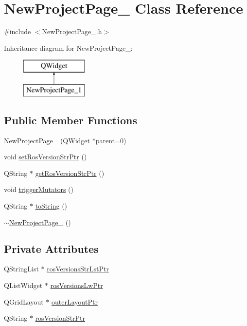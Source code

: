 \hypertarget{class_new_project_page__1}{\section{New\-Project\-Page\-\_ Class Reference}
\label{class_new_project_page__1}
}


{\ttfamily \#include $<$New\-Project\-Page\-\_.\-h$>$}

Inheritance diagram for New\-Project\-Page\-\_\-:\begin{figure}[H]
\begin{center}
\leavevmode
\includegraphics[height=2.000000cm]{class_new_project_page__1}
\end{center}
\end{figure}
\subsection*{Public Member Functions}
\begin{DoxyCompactItemize}
\item 
\hyperlink{class_new_project_page__1_a07325313c0bd209fbb9062e779276cff}{New\-Project\-Page\-\_} (Q\-Widget $\ast$parent=0)
\item 
void \hyperlink{class_new_project_page__1_a49402d5661fd96e07e285dc7d2605d9a}{set\-Ros\-Version\-Str\-Ptr} ()
\item 
Q\-String $\ast$ \hyperlink{class_new_project_page__1_a1c3596224d1afd5eba915c537648c3e7}{get\-Ros\-Version\-Str\-Ptr} ()
\item 
void \hyperlink{class_new_project_page__1_ac71e31a9a906f731b70711346bfa262d}{trigger\-Mutators} ()
\item 
Q\-String $\ast$ \hyperlink{class_new_project_page__1_aa83d0dab668fb77a30a2275b59d654e0}{to\-String} ()
\item 
\hyperlink{class_new_project_page__1_a716011001a4f599c2b7f2d53c0429dfb}{$\sim$\-New\-Project\-Page\-\_} ()
\end{DoxyCompactItemize}
\subsection*{Private Attributes}
\begin{DoxyCompactItemize}
\item 
Q\-String\-List $\ast$ \hyperlink{class_new_project_page__1_a63e7e74af698edd3d4b72ed84864ad87}{ros\-Versions\-Str\-Lst\-Ptr}
\item 
Q\-List\-Widget $\ast$ \hyperlink{class_new_project_page__1_a45bba5023ff9ebd180cc0be64367b37a}{ros\-Versions\-Lw\-Ptr}
\item 
Q\-Grid\-Layout $\ast$ \hyperlink{class_new_project_page__1_a809165b50ce35fa0812179209aba9294}{outer\-Layout\-Ptr}
\item 
Q\-String $\ast$ \hyperlink{class_new_project_page__1_a0929e17b526e8267f97a6ec6f0f3b629}{ros\-Version\-Str\-Ptr}
\end{DoxyCompactItemize}


